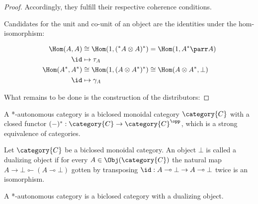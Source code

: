 \documentclass[DIN, pagenumber=false, fontsize=11pt, parskip=half, colorinlistoftodos, svgnames]{scrartcl}
\begin{document}
\begin{proof}
		Accordingly, they fulfill their respective coherence conditions.
		
		Candidates for the unit and co-unit of an object are the identities under the hom-isomorphism:
		
		\begin{center}
			\begin{align*}
				\Hom(A,A) &\cong \Hom(1, ({^*A} \otimes A)^*) = \Hom(1, A^* \parr A)\\
				\id & \mapsto \tau_A\\
				\Hom(A^*, A^*) &\cong \Hom(1, (A \otimes A^*)^*) \cong \Hom( A \otimes A^*, \bot) \\
				\id & \mapsto \gamma_A
			\end{align*}
		\end{center}
		
		
		What remains to be done is the construction of the distributors:
		
	\end{proof}
	
	
	\iffalse
	\begin{definition}
		\label{def: autoCatBarrA}
		A *-autonomous category is a biclosed monoidal category $\category{C} $ with a closed functor $(-)^*: \category{C} \rightarrow \category{C}^\opp $, which is a strong equivalence of categories.     
	\end{definition}
	
	\begin{definition}
		\label{def: dualizingObj}
		Let $\category{C} $ be a biclosed monoidal category. 
		An object $\bot $ is called a dualizing object if for every $A \in \Obj(\category{C}) $ the natural map $A \rightarrow \bot \multimapinv (A \multimap \bot) $ gotten by transposing $\id: A \multimap \bot \rightarrow A\multimap \bot $ twice is an isomorphism. 
	\end{definition}
	
	\begin{definition}
		\label{def: autoCatBarrB}
		A *-autonomous category is a biclosed category with a dualizing object.
	\end{definition}
	
\end{document}
